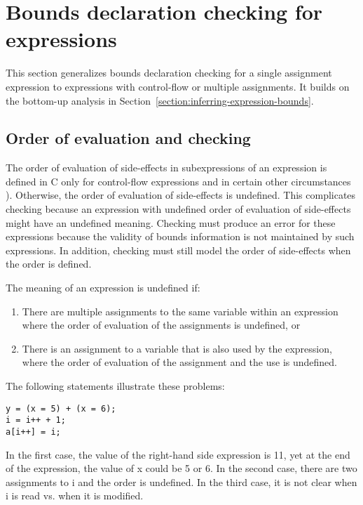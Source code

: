 \section{Bounds declaration checking for expressions}

\label{section:checking-assignment-expressions}
\label{section:checking-nested-assignment-expressions}

This section generalizes bounds declaration checking for a single
assignment expression to expressions with control-flow or multiple
assignments.
It builds on the bottom-up analysis in
Section~\ref{section:inferring-expression-bounds}.

\subsection{Order of evaluation and checking}
\label{section:avoiding-undefinedness}

The order of evaluation of side-effects in subexpressions of an expression is defined in C only for 
control-flow expressions and in certain other circumstances \cite[Section 6.5,Annex C]{ISO2011}).
Otherwise, the order of evaluation of side-effects is undefined.   This complicates checking 
because an expression with undefined order of evaluation of side-effects might have an 
undefined meaning.  Checking must produce an error for these expressions because the
validity of bounds information is not maintained by such expressions.   In addition, checking must still
model the order of side-effects when the order is defined.

The meaning of an expression is undefined if:

\begin{enumerate}
\item
  There are multiple assignments to the same variable within an
  expression where the order of evaluation of the assignments is
  undefined, or
\item
  There is an assignment to a variable that is also used by the
  expression, where the order of evaluation of the assignment and the
  use is undefined.
\end{enumerate}

The following statements illustrate these problems:

\begin{lstlisting}
y = (x = 5) + (x = 6);
i = i++ + 1;
a[i++] = i;
\end{lstlisting}

In the first case, the value of the right-hand side expression is 11,
yet at the end of the expression, the value of x could be 5 or 6. In the
second case, there are two assignments to i and the order is undefined.
In the third case, it is not clear when i is read vs. when it is
modified.

